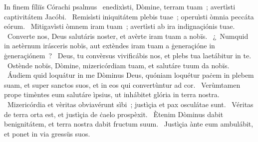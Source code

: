 { In finem fíliïs Córachi psalmus}
{%
~enedixìsti, Dòmine, terram tuam~; avertìsti captivitátem Jacóbi. 
~Remisìsti iniquitátem plebis tuae~; operuìsti òmnia peccáta eórum. 
~Mitigavìsti òmnem iram tuam~; avertìsti ab ira indignaçiónis tuae. 
~Converte nos, Deus salutáris noster, et avèrte iram tuam a nobïs. 
~¿~Numquid in aetèrnum irásceris nobïs, aut extèndes iram tuam a ġeneraçióne in ġeneraçiónem~? 
~Deus, tu convèrsus vivificábis nos, et plebs tua laetábitur in te. 
~Ostènde nobïs, Dòmine, mizericórdiam tuam, et salutáre tuum da nobïs. 
~Áudiem quid loquátur in me Dòminus Deus, quóniam loquétur paċem in plebem suam, et super sanctos suos, et in eos qui convertùntur ad cor. 
~Verùmtamen prope timèntes eum salutáre ìpsius, ut inhábitet glória in terra nostra. 
~Mizericórdia et vèritas obviavérunt sìbi~; justìçia et pax osculátae sunt. 
~Véritas de terra orta est, et justìçia de ċaelo prospèxit. 
~Ètenim Dòminus dabit benignitátem, et terra nostra dabit fructum suum. 
~Justìçia ànte eum ambulábit, et ponet in via gressüs suos. 
}
